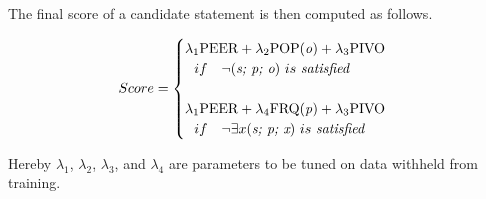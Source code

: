 \noindent
The final score of a candidate statement is then computed as follows.

\begin{defn}
\label{def:ensemble}
{\small
\begin{equation*}
Score=\begin{cases}
 \lambda_1 \text{PEER} + \lambda_2 \text{POP(\textit{o})} + \lambda_3 \text{PIVO}\\ \ \ if\ \ \ \neg(\textit{s; p; o}) \ is \ \mathit{satisfied}\\ \\
 \lambda_1 \text{PEER} + \lambda_4 \text{FRQ(\textit{p})} + \lambda_3 \text{PIVO}\\ \ \ if\ \ \ \neg \exists x (\textit{s; p; x}) \ is \ \mathit{satisfied}\\
\end{cases}
\end{equation*}}
\end{defn}


Hereby $\lambda_1$, $\lambda_2$, $\lambda_3$, and $\lambda_4$ are parameters to be tuned on data withheld from training.
